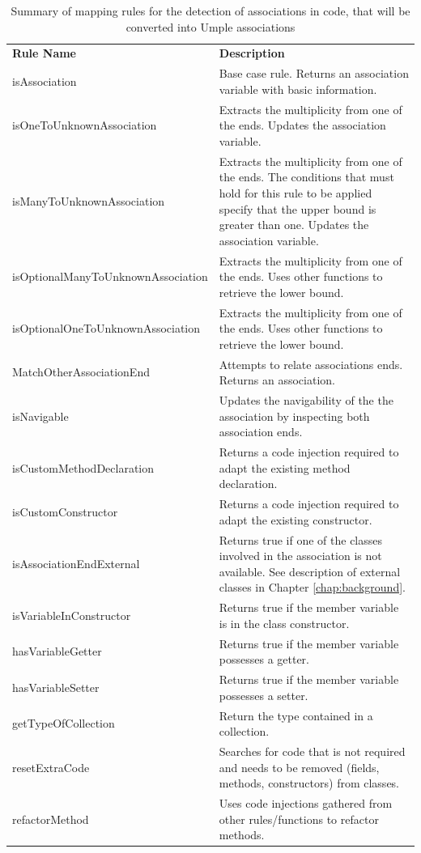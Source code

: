 \begin{table}[h]
\caption{Summary of mapping rules for the detection of associations in code, that will be converted into Umple associations}
\label{table:assocsRules}
\centering
	\begin{tabularx}{\textwidth}{X|X}
		\toprule
		\rowcolor[HTML]{BBDAFF}
        \textbf{Rule Name} & \textbf{Description}  \\ 
        isAssociation & Base case rule. Returns an association variable with basic information.  \\ 
        isOneToUnknownAssociation & Extracts the multiplicity from one of the ends. Updates the association variable.  \\ 
        isManyToUnknownAssociation &  Extracts the multiplicity from one of the ends. The conditions that must hold for this rule to be applied specify that the upper bound is greater than one. Updates the association variable.  \\ 
        isOptionalManyToUnknownAssociation & Extracts the multiplicity from one of the ends. Uses other functions to retrieve the lower bound. \\ 
        isOptionalOneToUnknownAssociation & Extracts the multiplicity from one of the ends. Uses other functions to retrieve the lower bound. \\ 
        MatchOtherAssociationEnd & Attempts to relate associations ends. Returns an association. \\ 
        isNavigable & Updates the navigability of the the association by inspecting both association ends.  \\ 
        isCustomMethodDeclaration & Returns a code injection required to adapt the existing method declaration.\\ 
        isCustomConstructor  & Returns a code injection required to adapt the existing constructor.  
\\ 
\rowcolor{aliceblue} 
        isAssociationEndExternal & Returns true if one of the classes involved in the association is not available. See description of external classes in Chapter \ref{chap:background}.
\\   
\rowcolor{aliceblue} 
        isVariableInConstructor & Returns true if the member variable is in the class constructor.
\\    
\rowcolor{aliceblue}  
        hasVariableGetter & Returns true if the member variable possesses a getter. 
\\        
\rowcolor{aliceblue}
        hasVariableSetter & Returns true if the member variable possesses a setter. 
\\         
\rowcolor{aliceblue}  
		getTypeOfCollection& Return the type contained in a collection. 
\\           
\rowcolor{aliceblue} 
		resetExtraCode & Searches for code that is not required and needs to be removed (fields, methods, constructors) from classes. 
\\  
\rowcolor{aliceblue} 
 		refactorMethod & Uses code injections gathered from other rules/functions to refactor methods.\\ \hline
\end{tabularx}
\end{table}


